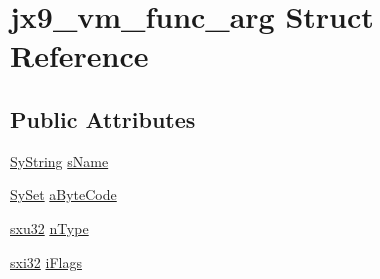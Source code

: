 \hypertarget{structjx9__vm__func__arg}{\section{jx9\-\_\-vm\-\_\-func\-\_\-arg Struct Reference}
\label{d4/d14/structjx9__vm__func__arg}
}
\subsection*{Public Attributes}
\begin{DoxyCompactItemize}
\item 
\hyperlink{struct_sy_string}{Sy\-String} \hyperlink{structjx9__vm__func__arg_a948e8c6ddc84a6371c775d8f781b9ff5}{s\-Name}
\item 
\hyperlink{struct_sy_set}{Sy\-Set} \hyperlink{structjx9__vm__func__arg_abb3212d6a14c83adecf21863dabecc7b}{a\-Byte\-Code}
\item 
\hyperlink{unqlite_8c_abc5a8a3f345c200c98c485551f49666e}{sxu32} \hyperlink{structjx9__vm__func__arg_a026dd986500bac6fb6f106a744f614fb}{n\-Type}
\item 
\hyperlink{unqlite_8c_a5a58035d4ae379178e2ca46cc3272fc5}{sxi32} \hyperlink{structjx9__vm__func__arg_ae268e9c5e80a0f7cf5a4b1c0b56a6e69}{i\-Flags}
\end{DoxyCompactItemize}


